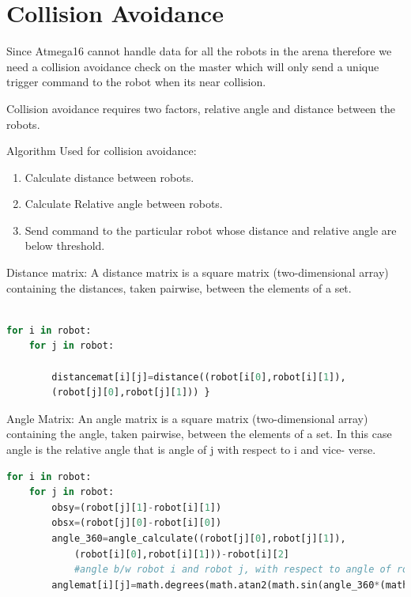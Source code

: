 \documentclass[main.tex]{subfiles}
\begin{document}
\pagebreak	

\section{Collision Avoidance}

Since Atmega16 cannot handle data for all the robots in the arena therefore we need a collision avoidance check on the master which will only send a unique trigger command to the robot when its near collision. 

Collision avoidance requires two factors, relative angle and distance between the robots.

Algorithm Used for collision avoidance:
\begin{enumerate}

\item Calculate distance between robots.
\item Calculate Relative angle between robots.
\item Send command to the particular robot whose distance and relative angle are below threshold.
\end{enumerate}


Distance matrix: A distance matrix is a square matrix (two-dimensional array) containing the distances, taken pairwise, between the elements of a set.
\begin{lstlisting}[language=Python, caption = Distance Matrix ]

for i in robot:
	for j in robot:
	
		distancemat[i][j]=distance((robot[i[0],robot[i][1]),
		(robot[j][0],robot[j][1])) }
\end{lstlisting}
Angle Matrix: An angle matrix is a square matrix (two-dimensional array) containing the angle, taken pairwise, between the elements of a set. In this case angle is the relative angle that is angle of j with respect to i and vice- verse.

\begin{lstlisting}[language=Python, caption = Angle Matrix ]
for i in robot:
	for j in robot:
		obsy=(robot[j][1]-robot[i][1])
		obsx=(robot[j][0]-robot[i][0])
		angle_360=angle_calculate((robot[j][0],robot[j][1]),
			(robot[i][0],robot[i][1]))-robot[i][2] 
			#angle b/w robot i and robot j, with respect to angle of robot i (relative angle)       
		anglemat[i][j]=math.degrees(math.atan2(math.sin(angle_360*(math.pi/180)),math.cos(angle_360*(math.pi/180)))) #relative angle in range(-180 to 180) 
\end{lstlisting}
\end{document}
